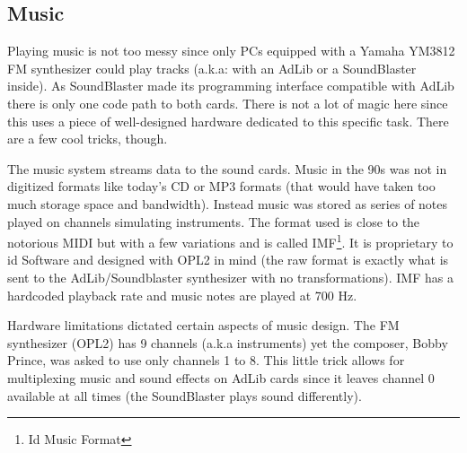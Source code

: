 \subsection{Music}
Playing music is not too messy since only PCs equipped with a Yamaha YM3812 FM synthesizer could play tracks (a.k.a: with an AdLib or a SoundBlaster inside). As SoundBlaster made its programming interface compatible with AdLib there is only one code path to both cards. There is not a lot of magic here since this uses a piece of well-designed hardware dedicated to this specific task. There are a few cool tricks, though.\\
\par
The music system streams data to the sound cards. Music in the 90s was not in digitized formats like today's CD or MP3 formats (that would have taken too much storage space and bandwidth). Instead music was stored as series of notes played on channels simulating instruments. The format used is close to the notorious MIDI but with a few variations and is called IMF\footnote{Id Music Format}. It is proprietary to id Software and designed with OPL2 in mind (the raw format is exactly what is sent to the AdLib/Soundblaster synthesizer with no transformations). IMF has a hardcoded playback rate and music notes are played at 700 Hz.\\
\par
Hardware limitations dictated certain aspects of music design. The FM synthesizer (OPL2) has 9 channels (a.k.a instruments) yet the composer, Bobby Prince, was asked to use only channels 1 to 8. This little trick allows for multiplexing music and sound effects on AdLib cards since it leaves channel 0 available at all times (the SoundBlaster plays sound differently).\\




